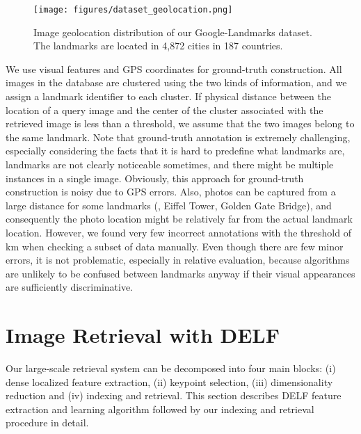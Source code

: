 \documentclass[10pt,twocolumn,letterpaper]{article}
\begin{document}
\begin{figure}[t]
\begin{center}
   \texttt{[image: figures/dataset\_geolocation.png]}
\end{center}
	\vspace{-15pt}
	\caption{Image geolocation distribution of our Google-Landmarks dataset.  The landmarks are located in 4,872 cities in 187 countries.}
\label{fig:geolocation}
\vspace{-6pt}                                                                                                                                                                                                           
\end{figure}



We use visual features and GPS coordinates for ground-truth construction.
All images in the database are clustered using the two kinds of information, and we assign a landmark identifier to each cluster.
If physical distance between the location of a query image and the center of the cluster associated with the retrieved image is less than a threshold, we assume that the two images belong to the same landmark.
Note that ground-truth annotation is extremely challenging, especially considering the facts that it is hard to predefine what landmarks are, landmarks are not clearly noticeable sometimes, and there might be multiple instances in a single image.
Obviously, this approach for ground-truth construction is noisy due to GPS errors.
Also, photos can be captured from a large distance for some landmarks (\eg, Eiffel Tower, Golden Gate Bridge), and consequently the photo location might be relatively far from the actual landmark location.
However, we found very few incorrect annotations with the threshold of km when checking a subset of data manually.
Even though there are few minor errors, it is not problematic, especially in relative evaluation, because algorithms are unlikely to be confused between landmarks anyway if their visual appearances are sufficiently discriminative.




 

\section{Image Retrieval with DELF} \label{sec:method}

Our large-scale retrieval system can be decomposed into four main blocks: (i) dense localized
feature extraction, (ii) keypoint selection, (iii) dimensionality reduction and 
(iv) indexing and retrieval.
This section describes DELF feature extraction and learning algorithm followed by our indexing and retrieval procedure in detail.
\end{document}
